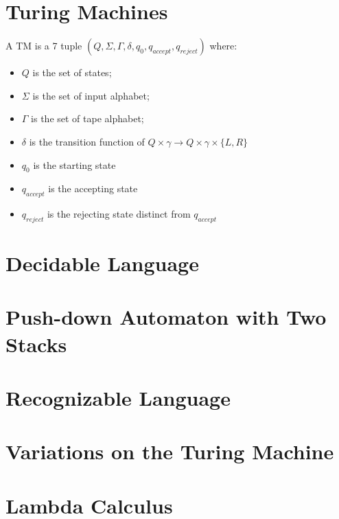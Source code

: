 \documentclass{report}
\begin{document}
	\section{Turing Machines}
		\begin{defn}
			A TM is a 7 tuple $(Q,\Sigma,\Gamma,\delta,q_0,q_{accept},q_{reject})$ where:
			\begin{itemize}
				\item $Q$ is the set of states;
				\item $\Sigma$ is the set of input alphabet;
				\item $\Gamma$ is the set of tape alphabet;
				\item $\delta$ is the transition function of $Q \times \gamma \rightarrow Q \times \gamma \times \{L,R\}$
				\item $q_0$ is the starting state
				\item $q_{accept}$ is the accepting state
				\item $q_{reject}$ is the rejecting state distinct from $q_{accept}$
			\end{itemize}
		\end{defn}
		\section{Decidable Language}
		
		\section{Push-down Automaton with Two Stacks}
		
		\section{Recognizable Language}
		
		\section{Variations on the Turing Machine}
		
		\section{Lambda Calculus}
\end{document}
